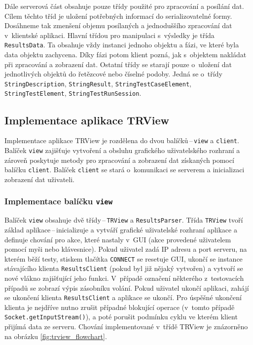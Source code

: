 	Dále serverová část obsahuje pouze třídy použité pro zpracování a posílání dat. Cílem těchto tříd je uložení potřebných informací do serializovatelné formy. Dosáhneme tak zmenšení objemu posílaných a jednoduššího zpracování dat v~klientské aplikaci. Hlavní třídou pro manipulaci s~výsledky je třída \texttt{ResultsData}. Ta obsahuje vždy instanci jednoho objektu a fázi, ve které byla data objektu zachycena. Díky fázi potom klient pozná, jak s~objektem nakládat při zpracování a zobrazení dat. Ostatní třídy se starají pouze o~uložení dat jednotlivých objektů do řetězcové nebo číselné podoby. Jedná se o~třídy \texttt{StringDescription}, \texttt{StringResult}, \texttt{StringTestCaseElement}, \texttt{StringTestElement}, \texttt{StringTestRunSession}.

    \subsection{Implementace aplikace TRView}
    Implementace aplikace TRView je rozdělena do dvou balíčků\,--\,\texttt{view} a \texttt{client}. Balíček \texttt{view} zajišťuje vytvoření a obsluhu grafického uživatelského rozhraní a zároveň poskytuje metody pro zpracování a zobrazení dat získaných pomocí balíčku \texttt{client}. Balíček \texttt{client} se stará o~komunikaci se serverem a inicializaci zobrazení dat uživateli. 
    
      \subsubsection{Implementace balíčku \texttt{view}}
      Balíček \texttt{view} obsahuje dvě třídy\,--\,\texttt{TRView} a \texttt{ResultsParser}. Třída \texttt{TRView} tvoří základ aplikace\,--\,inicializuje a vytváří grafické uživatelské rozhraní aplikace a definuje chování pro akce, které nastaly v~GUI (akce provedené uživatelem pomocí myši nebo klávesnice). Pokud uživatel zadá IP adresu a port serveru, na kterém běží testy, stiskem tlačítka \texttt{CONNECT} se resetuje GUI, ukončí se instance stávajícího klienta \texttt{ResultsClient} (pokud byl již nějaký vytvořen) a vytvoří se nové vlákno zajišťující jeho funkci. V~případě označení některého z~testovacích případů se zobrazí výpis zásobníku volání. Pokud uživatel ukončí aplikaci, zahájí se ukončení klienta \texttt{ResultsClient} a aplikace se ukončí. Pro úspěšné ukončení klienta je nejdříve nutno zrušit případné blokující operace (v~tomto případě \texttt{Socket.getInputStream()}), a poté porušit podmínku cyklu ve kterém klient přijímá data ze serveru. Chování implementované v~třídě TRView je znázorněno na obrázku \ref{fig:trview_flowchart}.

